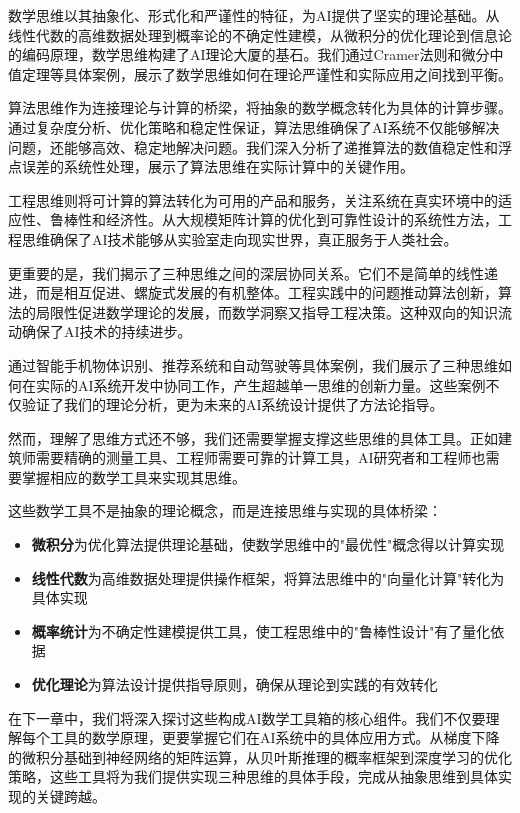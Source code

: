 数学思维以其抽象化、形式化和严谨性的特征，为AI提供了坚实的理论基础。从线性代数的高维数据处理到概率论的不确定性建模，从微积分的优化理论到信息论的编码原理，数学思维构建了AI理论大厦的基石。我们通过Cramer法则和微分中值定理等具体案例，展示了数学思维如何在理论严谨性和实际应用之间找到平衡。

算法思维作为连接理论与计算的桥梁，将抽象的数学概念转化为具体的计算步骤。通过复杂度分析、优化策略和稳定性保证，算法思维确保了AI系统不仅能够解决问题，还能够高效、稳定地解决问题。我们深入分析了递推算法的数值稳定性和浮点误差的系统性处理，展示了算法思维在实际计算中的关键作用。

工程思维则将可计算的算法转化为可用的产品和服务，关注系统在真实环境中的适应性、鲁棒性和经济性。从大规模矩阵计算的优化到可靠性设计的系统性方法，工程思维确保了AI技术能够从实验室走向现实世界，真正服务于人类社会。

更重要的是，我们揭示了三种思维之间的深层协同关系。它们不是简单的线性递进，而是相互促进、螺旋式发展的有机整体。工程实践中的问题推动算法创新，算法的局限性促进数学理论的发展，而数学洞察又指导工程决策。这种双向的知识流动确保了AI技术的持续进步。

通过智能手机物体识别、推荐系统和自动驾驶等具体案例，我们展示了三种思维如何在实际的AI系统开发中协同工作，产生超越单一思维的创新力量。这些案例不仅验证了我们的理论分析，更为未来的AI系统设计提供了方法论指导。

然而，理解了思维方式还不够，我们还需要掌握支撑这些思维的具体工具。正如建筑师需要精确的测量工具、工程师需要可靠的计算工具，AI研究者和工程师也需要掌握相应的数学工具来实现其思维。

这些数学工具不是抽象的理论概念，而是连接思维与实现的具体桥梁：
\begin{itemize}
\item \textbf{微积分}为优化算法提供理论基础，使数学思维中的"最优性"概念得以计算实现
\item \textbf{线性代数}为高维数据处理提供操作框架，将算法思维中的"向量化计算"转化为具体实现
\item \textbf{概率统计}为不确定性建模提供工具，使工程思维中的"鲁棒性设计"有了量化依据
\item \textbf{优化理论}为算法设计提供指导原则，确保从理论到实践的有效转化
\end{itemize}

在下一章中，我们将深入探讨这些构成AI数学工具箱的核心组件。我们不仅要理解每个工具的数学原理，更要掌握它们在AI系统中的具体应用方式。从梯度下降的微积分基础到神经网络的矩阵运算，从贝叶斯推理的概率框架到深度学习的优化策略，这些工具将为我们提供实现三种思维的具体手段，完成从抽象思维到具体实现的关键跨越。


